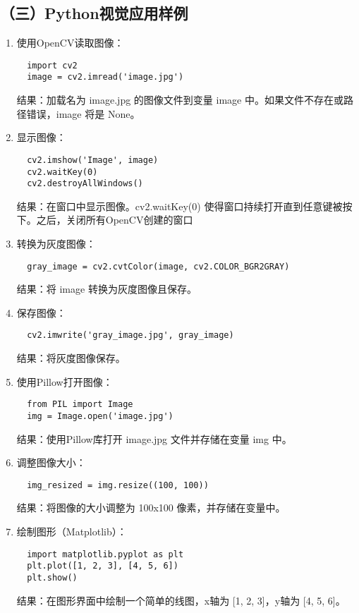 \documentclass[UTF8]{ctexart}
\begin{document}
\subsection*{（三）Python视觉应用样例}
\begin{enumerate}
  \item 使用OpenCV读取图像：
  \begin{verbatim}
  import cv2
  image = cv2.imread('image.jpg')
  \end{verbatim}
  结果：加载名为 image.jpg 的图像文件到变量 image 中。如果文件不存在或路径错误，image 将是 None。
  
  \item 显示图像：
  \begin{verbatim}
  cv2.imshow('Image', image)
  cv2.waitKey(0)
  cv2.destroyAllWindows()
  \end{verbatim}
  结果：在窗口中显示图像。cv2.waitKey(0) 使得窗口持续打开直到任意键被按下。之后，关闭所有OpenCV创建的窗口
  
  \item 转换为灰度图像：
  \begin{verbatim}
  gray_image = cv2.cvtColor(image, cv2.COLOR_BGR2GRAY)
  \end{verbatim}
    结果：将 image 转换为灰度图像且保存。

  \item 保存图像：
  \begin{verbatim}
  cv2.imwrite('gray_image.jpg', gray_image)
  \end{verbatim}
  结果：将灰度图像保存。

  \item 使用Pillow打开图像：
  \begin{verbatim}
  from PIL import Image
  img = Image.open('image.jpg')
  \end{verbatim}
  结果：使用Pillow库打开 image.jpg 文件并存储在变量 img 中。
  
  \item 调整图像大小：
  \begin{verbatim}
  img_resized = img.resize((100, 100))
  \end{verbatim}
  结果：将图像的大小调整为 100x100 像素，并存储在变量中。
  
  \item 绘制图形（Matplotlib）：
  \begin{verbatim}
  import matplotlib.pyplot as plt
  plt.plot([1, 2, 3], [4, 5, 6])
  plt.show()
  \end{verbatim}
  结果：在图形界面中绘制一个简单的线图，x轴为 [1, 2, 3]，y轴为 [4, 5, 6]。
  

\end{enumerate}
\end{document}
